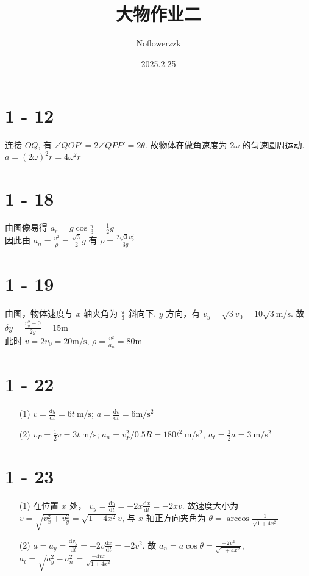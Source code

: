 \documentclass{article}
\title{大物作业二}
\author{Noflowerzzk}
\date{2025.2.25}
\newcommand{\dd}{\mathrm{d}}
\newcommand{\mpss}{\ \mathrm{m / s^2}}
\begin{document}
\maketitle

\section*{1 - 12}

连接 $OQ$, 有 $\angle QOP' = 2\angle QPP' = 2 \theta$. 故物体在做角速度为 $2\omega$ 的匀速圆周运动. $a = (2\omega)^2r = 4\omega^2r$

\section*{1 - 18}

由图像易得 $a_r = g \cos \frac{\pi}{3} = \frac{1}{2}g$ \\

因此由 $a_n = \frac{v^2}{\rho} = \frac{\sqrt{3}}{2}g$ 有 $\rho = \frac{2\sqrt{3}v_0^2}{3g}$

\section*{1 - 19}

由图，物体速度与 $x$ 轴夹角为 $\frac{\pi}{3}$ 斜向下. $y$ 方向，有 $v_y = \sqrt{3}v_0 = 10\sqrt{3} \mathrm{m / s}$. 故 $\delta y = \frac{v_y^2 - 0}{2g} = 15 \mathrm{m}$ \\

此时 $v = 2v_0 = 20 \mathrm{m / s}$, $\rho = \frac{v^2}{a_n} = 80 \mathrm{m}$

\section*{1 - 22}

\begin{itemize}
    \item [(1)] $v = \frac{\dd y}{\dd t} = 6t\ \mathrm{m / s}$; $a = \frac{\dd v}{\dd t} = 6 \mathrm{m / s^2}$
    \item [(2)] $v_P = \frac{1}{2}v = 3t\ \mathrm{m / s}$; $a_n = v_P^2 / 0.5R = 180t^2 \mpss,\ a_t = \frac{1}{2}a = 3 \mpss$
\end{itemize}

\section*{1 - 23}

\begin{itemize}
    \item [(1)] 在位置 $x$ 处， $v_y = \frac{\dd y}{\dd t} = -2x\frac{\dd x}{\dd t} = -2xv$. 故速度大小为 $v = \sqrt{v_x^2 + v_y^2} = \sqrt{1 + 4x^2} v$, 与 $x$ 轴正方向夹角为 $\theta = \arccos \frac{1}{\sqrt{1 + 4x^2}}$
    \item [(2)] $a = a_y = \frac{\dd v_y}{\dd t} = -2v \frac{\dd x}{\dd t} = -2v^2$. 故 $a_n = a \cos \theta = \frac{-2v^2}{\sqrt{1 + 4x^2}}$, $a_t = \sqrt{a_y^2 - a_n^2} = \frac{-4vx}{\sqrt{1 + 4x^2}}$
\end{itemize}
\end{document}

